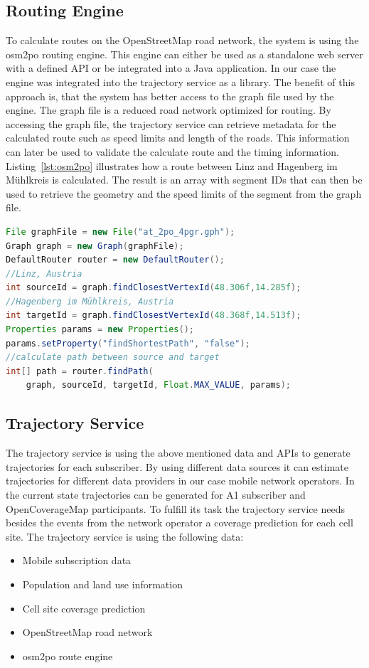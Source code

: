 \documentclass[master,english]{hgbthesis}
\begin{document}
\subsection{Routing Engine}
To calculate routes on the OpenStreetMap road network, the system is using the osm2po routing engine. This engine can either be used as a standalone web server with a defined API or be integrated into a Java application. In our case the engine was integrated into the trajectory service as a library. The benefit of this approach is, that the system has better access to the graph file used by the engine. The graph file is a reduced road network optimized for routing. By accessing the graph file, the trajectory service can retrieve metadata for the calculated route such as speed limits and length of the roads. This information can later be used to validate the calculate route and the timing information. 
Listing~\ref{lst:osm2po} illustrates how a route between Linz and Hagenberg im Mühlkreis is calculated. The result is an array with segment IDs that can then be used to retrieve the geometry and the speed limits of the segment from the graph file.
\begin{lstlisting}[language=Java,style=JAVA,caption={Example code to calculate a route between two points},label={lst:osm2po}]
File graphFile = new File("at_2po_4pgr.gph");
Graph graph = new Graph(graphFile);
DefaultRouter router = new DefaultRouter();
//Linz, Austria
int sourceId = graph.findClosestVertexId(48.306f,14.285f);
//Hagenberg im Mühlkreis, Austria
int targetId = graph.findClosestVertexId(48.368f,14.513f);
Properties params = new Properties();
params.setProperty("findShortestPath", "false");
//calculate path between source and target
int[] path = router.findPath(
    graph, sourceId, targetId, Float.MAX_VALUE, params);
\end{lstlisting}
\subsection{Trajectory Service}
The trajectory service is using the above mentioned data and APIs to generate trajectories for each subscriber. By using different data sources it can estimate trajectories for different data providers in our case mobile network operators. In the current state trajectories can be generated for A1 subscriber and OpenCoverageMap participants. To fulfill its task the trajectory service needs besides the events from the network operator a coverage prediction for each cell site. The trajectory service is using the following data:
\begin{itemize}
\item Mobile subscription data
\item Population and land use information
\item Cell site coverage prediction
\item OpenStreetMap road network
\item osm2po route engine
\end{itemize}
\end{document}
